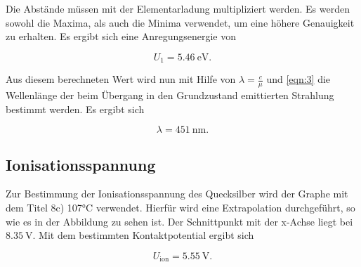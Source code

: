 Die Abstände müssen mit der Elementarladung multipliziert werden. Es werden sowohl die Maxima, 
als auch die Minima verwendet, um eine höhere Genauigkeit zu erhalten. Es ergibt sich eine 
Anregungsenergie von 

\begin{equation*}
U_1 = \SI{5.46}{\eV}.
\end{equation*}

Aus diesem berechneten Wert wird nun mit Hilfe von $\lambda = \frac{c}{\mu}$ und \eqref{eqn:3} die Wellenlänge
der beim Übergang in den Grundzustand emittierten Strahlung bestimmt werden. Es ergibt sich

\begin{equation*}
\lambda = \SI{451}{\nano\meter}.
\end{equation*}

\subsection{Ionisationsspannung}

Zur Bestimmung der Ionisationsspannung des Quecksilber wird der Graphe mit dem Titel 8c) 107°C verwendet. 
Hierfür wird eine Extrapolation durchgeführt, so wie es in der Abbildung zu sehen ist. Der Schnittpunkt mit 
der x-Achse liegt bei $\SI{8.35}{\volt}$. Mit dem bestimmten Kontaktpotential ergibt sich

\begin{equation*}
U_\text{ion} = \SI{5.55}{\volt}.
\end{equation*}

